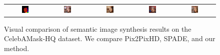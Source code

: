 \begin{figure}[]
\begin{tabular} {cc|cc|c}
\includegraphics[width=0.1932\textwidth]{Images/Rec/Faces/label/28059.png} & \includegraphics[width=0.1932\textwidth]{Images/Rec/Faces/gt/28059.jpg} &
\includegraphics[width=0.1932\textwidth]{Images/Rec/Faces/pix2pixhd/28059.jpg} &   \includegraphics[width=0.1932\textwidth]{Images/Rec/Faces/spade/28059.jpg} &  \includegraphics[width=0.1932\textwidth]{Images/Rec/Faces/ours/28059.png} \\





\end{tabular}
\vspace{-2mm}
	\caption{Visual  comparison  of  semantic  image  synthesis  results  on  the  CelebAMask-HQ dataset. We compare Pix2PixHD, SPADE, and our method.}
	\label{fig:CelebAMask-HQ results}	
\vspace{-3mm}	
 \end{figure}
 \egroup
 \addtolength{\tabcolsep}{4.5pt}